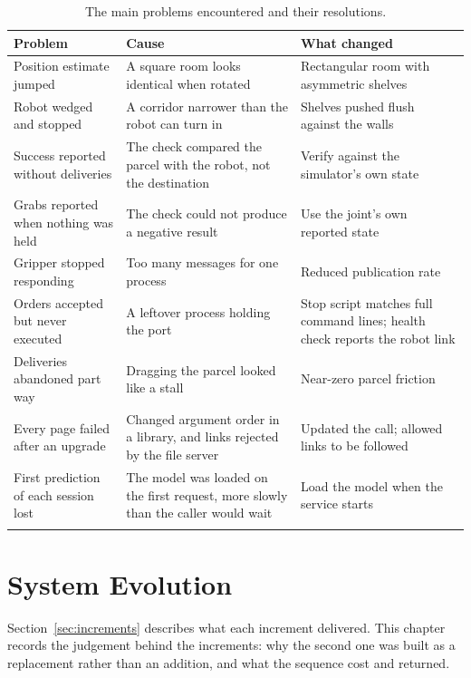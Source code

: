 \documentclass[12pt,a4paper]{report}
\begin{document}
\begin{longtable}{@{}p{}p{}p{}@{}}
\toprule
\textbf{Problem} & \textbf{Cause} & \textbf{What changed} \\
\midrule
\endhead
Position estimate jumped & A square room looks identical when rotated & Rectangular room with
asymmetric shelves \\
Robot wedged and stopped & A corridor narrower than the robot can turn in & Shelves pushed flush
against the walls \\
Success reported without deliveries & The check compared the parcel with the robot, not the
destination & Verify against the simulator's own state \\
Grabs reported when nothing was held & The check could not produce a negative result & Use the
joint's own reported state \\
Gripper stopped responding & Too many messages for one process & Reduced publication rate \\
Orders accepted but never executed & A leftover process holding the port & Stop script matches full
command lines; health check reports the robot link \\
Deliveries abandoned part way & Dragging the parcel looked like a stall & Near-zero parcel
friction \\
Every page failed after an upgrade & Changed argument order in a library, and links rejected by
the file server & Updated the call; allowed links to be followed \\
First prediction of each session lost & The model was loaded on the first request, more slowly
than the caller would wait & Load the model when the service starts \\
\bottomrule
\caption{The main problems encountered and their resolutions.}
\label{tab:challenges}
\end{longtable}

\chapter{System Evolution}
\label{ch:evolution}

Section~\ref{sec:increments} describes what each increment delivered. This chapter records the
judgement behind the increments: why the second one was built as a replacement rather than an
addition, and what the sequence cost and returned.
\end{document}
